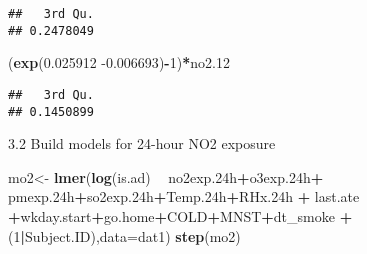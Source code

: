 \documentclass[12pt,]{article}
\newenvironment{Shaded}{\begin{snugshade}}{\end{snugshade}}
\newcommand{\DataTypeTok}[1]{\textcolor[rgb]{0.13,0.29,0.53}{#1}}
\newcommand{\DecValTok}[1]{\textcolor[rgb]{0.00,0.00,0.81}{#1}}
\newcommand{\FloatTok}[1]{\textcolor[rgb]{0.00,0.00,0.81}{#1}}
\newcommand{\KeywordTok}[1]{\textcolor[rgb]{0.13,0.29,0.53}{\textbf{#1}}}
\newcommand{\NormalTok}[1]{#1}
\newcommand{\OperatorTok}[1]{\textcolor[rgb]{0.81,0.36,0.00}{\textbf{#1}}}
\newcommand{\StringTok}[1]{\textcolor[rgb]{0.31,0.60,0.02}{#1}}
\begin{document}
\begin{verbatim}
##   3rd Qu. 
## 0.2478049
\end{verbatim}

\begin{Shaded}
\begin{Highlighting}[]
\NormalTok{(}\KeywordTok{exp}\NormalTok{(}\FloatTok{0.025912} \FloatTok{-0.006693}\NormalTok{)}\OperatorTok{-}\DecValTok{1}\NormalTok{)}\OperatorTok{*}\NormalTok{no2}\FloatTok{.12}
\end{Highlighting}
\end{Shaded}

\begin{verbatim}
##   3rd Qu. 
## 0.1450899
\end{verbatim}

3.2 Build models for 24-hour NO2 exposure

\begin{Shaded}
\begin{Highlighting}[]
\NormalTok{mo2<-}\StringTok{ }\KeywordTok{lmer}\NormalTok{(}\KeywordTok{log}\NormalTok{(is.ad) }\OperatorTok{~}\StringTok{ }\NormalTok{no2exp}\FloatTok{.24}\NormalTok{h}\OperatorTok{+}\NormalTok{o3exp}\FloatTok{.24}\NormalTok{h}\OperatorTok{+}\StringTok{ }\NormalTok{pmexp}\FloatTok{.24}\NormalTok{h}\OperatorTok{+}\NormalTok{so2exp}\FloatTok{.24}\NormalTok{h}\OperatorTok{+}\NormalTok{Temp}\FloatTok{.24}\NormalTok{h}\OperatorTok{+}\NormalTok{RHx}\FloatTok{.24}\NormalTok{h }\OperatorTok{+}\StringTok{ }\NormalTok{last.ate }\OperatorTok{+}\NormalTok{wkday.start}\OperatorTok{+}\NormalTok{go.home}\OperatorTok{+}\NormalTok{COLD}\OperatorTok{+}\NormalTok{MNST}\OperatorTok{+}\NormalTok{dt_smoke }\OperatorTok{+}\NormalTok{(}\DecValTok{1}\OperatorTok{|}\NormalTok{Subject.ID),}\DataTypeTok{data=}\NormalTok{dat1)}
\KeywordTok{step}\NormalTok{(mo2)}
\end{Highlighting}
\end{Shaded}
\end{document}
